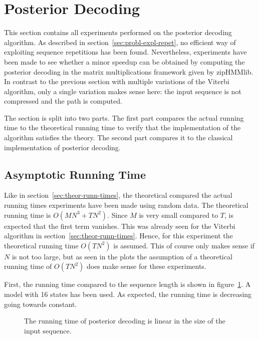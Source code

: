 \section{Posterior Decoding}

This section contains all experiments performed on the posterior decoding
algorithm. As described in section~\ref{sec:probl-expl-repet}, no efficient way
of exploiting sequence repetitions has been found. Nevertheless, experiments
have been made to see whether a minor speedup can be obtained by computing the
posterior decoding in the matrix multiplications framework given by
zipHMMlib. In contrast to the previous section with multiple variations of the
Viterbi algorithm, only a single variation makes sense here: the input sequence
is not compressed and the path is computed.

The section is split into two parts. The first part compares the actual
running time to the theoretical running time to verify that the implementation
of the algorithm satisfies the theory. The second part compares it to the
classical implementation of posterior decoding.

\subsection{Asymptotic Running Time}
\label{sec:asympt-runn-time}

Like in section~\ref{sec:theor-runn-times}, the theoretical compared the
actual running times experiments have been made using random data. The
theoretical running time is $O(M N^3 + TN^2)$. Since $M$ is very small compared
to $T$, is expected that the first term vanishes. This was already seen for the
Viterbi algorithm in section~\ref{sec:theor-runn-times}. Hence, for this
experiment the theoretical running time $O(TN^2)$ is assumed. This of course
only makes sense if $N$ is not too large, but as seen in the plots the
assumption of a theoretical running time of $O(TN^2)$ does make sense for these
experiments.

First, the running time compared to the sequence length is shown in
figure~\ref{fig:posterior_T}. A model with 16 states has been used. As expected,
the running time is decreasing going towards constant.

\begin{figure}
  \centering
  
  \caption{The running time of posterior decoding is linear in the size of the
    input sequence.}
  \label{fig:posterior_T}
\end{figure}

